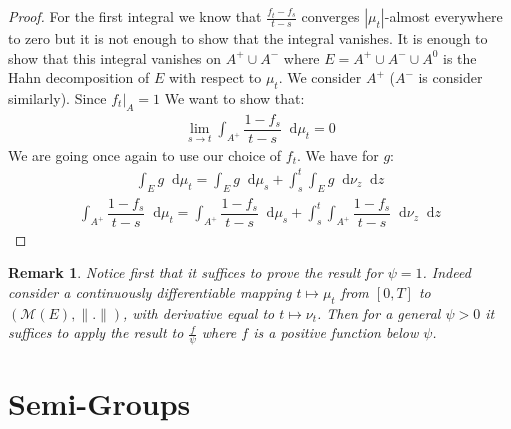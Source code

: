 \documentclass[11pt,a4paper]{article}
\newcommand{\MC}{\mathcal{M}}
\newcommand{\dd}{\mathop{}\!\mathrm{d}}
\newtheorem{remark}[theorem]{Remark}
\begin{document}
\begin{proof}
    For the first integral we know that $\frac{f_{t}-f_s}{t-s}$ converges $|\mu_t|$-almost everywhere to zero but it is not enough to show that the integral vanishes. It is enough to show that this integral vanishes on $A^+\cup A^-$ where $E = A^+ \cup A^- \cup A^0$ is the Hahn decomposition of $E$ with respect to $\mu_t$. We consider $A^+$ ($A^-$ is consider similarly). Since $f_t|_A = 1$ We want to show that:
    \begin{align*}
        \lim\limits_{s\to t}\int_{A^+} \dfrac{1-f_s}{t-s}\dd\mu_{t } = 0
    \end{align*}
    We are going once again to use our choice of $f_t$. We have for $g$:
    \begin{align*}
        \int_E g \dd\mu_t = \int_E g\dd \mu_s + \int_s^t \int_Eg \dd\nu_z \dd z
    \end{align*}
    \begin{align*}
        \int_{A^+} \dfrac{1-f_s}{t-s}\dd\mu_{t }  = \int_{A^+}\dfrac{1-f_s}{t-s}\dd\mu_{s} + \int_s^t \int_{A^+}\dfrac{1-f_s}{t-s}\dd\nu_{z} \dd z
    \end{align*}
    \end{proof}
\begin{remark}
    Notice first that it suffices to prove the result for $\psi = 1$. Indeed consider a continuously differentiable mapping $t\mapsto \mu_t$ from $[0,T]$ to \(\left(\MC(E),\|.\|\right)\), with derivative equal to $t \mapsto\nu_t$. Then for a general $\psi > 0$ it suffices to apply the result to $\frac{f}{\psi}$ where $f$ is a positive function below $\psi$.
\end{remark}

\section{Semi-Groups}\label{section:semigroups}
\end{document}
